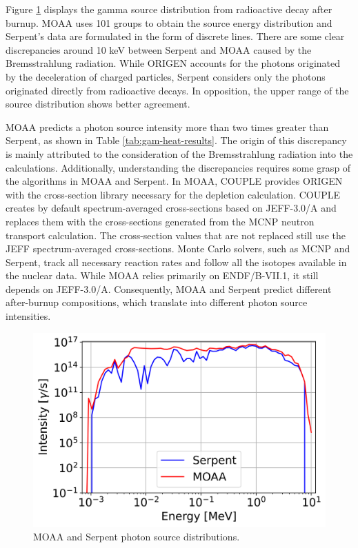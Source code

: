 Figure \ref{fig:g-source} displays the gamma source distribution from radioactive decay after burnup.
MOAA uses 101 groups to obtain the source energy distribution and Serpent's data are formulated in the form of discrete lines.
There are some clear discrepancies around 10 keV between Serpent and MOAA caused by the Bremsstrahlung radiation.
While ORIGEN accounts for the photons originated by the deceleration of charged particles, Serpent considers only the photons originated directly from radioactive decays.
In opposition, the upper range of the source distribution shows better agreement.

MOAA predicts a photon source intensity more than two times greater than Serpent, as shown in Table \ref{tab:gam-heat-results}.
The origin of this discrepancy is mainly attributed to the consideration of the Bremsstrahlung radiation into the calculations.
Additionally, understanding the discrepancies requires some grasp of the algorithms in MOAA and Serpent.
In MOAA, COUPLE provides ORIGEN with the cross-section library necessary for the depletion calculation.
COUPLE creates by default spectrum-averaged cross-sections based on JEFF-3.0/A and replaces them with the cross-sections generated from the MCNP neutron transport calculation.
The cross-section values that are not replaced still use the JEFF spectrum-averaged cross-sections.
Monte Carlo solvers, such as MCNP and Serpent, track all necessary reaction rates and follow all the isotopes available in the nuclear data.
While MOAA relies primarily on ENDF/B-VII.1, it still depends on JEFF-3.0/A.
Consequently, MOAA and Serpent predict different after-burnup compositions, which translate into different photon source intensities.

\begin{figure}[htbp!] %
    \centering
    \includegraphics[width=0.6\linewidth]{figures/g-source.png}
    \hfill
    \caption{MOAA and Serpent photon source distributions.}
    \label{fig:g-source}
\end{figure}


